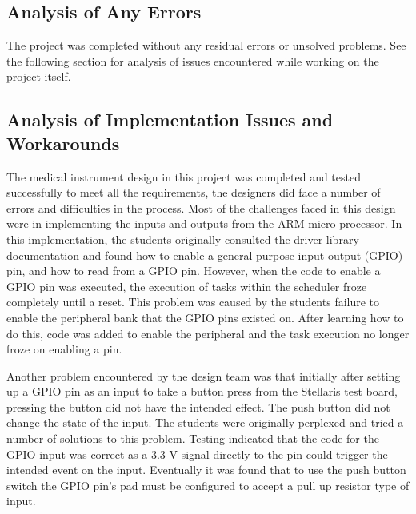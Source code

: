\documentclass[12pt]{article} %
\begin{document}
    \subsection{Analysis of Any Errors}
    The project was completed without any residual errors or unsolved problems.
    See the following section for analysis of issues encountered while working
    on the project itself.

    \subsection{Analysis of Implementation Issues and Workarounds}



    The medical instrument design in this project was completed and tested
    successfully to meet all the requirements, the designers did face a number
    of errors and difficulties in the process. Most of the challenges faced in
    this design were in implementing the inputs and outputs from the ARM micro
    processor. In this implementation, the students originally consulted the
    driver library documentation and found how to enable a general purpose
    input output (GPIO) pin, and how to read from a GPIO pin. However, when the
    code to enable a GPIO pin was executed, the execution of tasks within the
    scheduler froze completely until a reset. This problem was caused by the
    students failure to enable the peripheral bank that the GPIO pins existed
    on. After learning how to do this, code was added to enable the peripheral
    and the task execution no longer froze on enabling a pin.

    Another problem encountered by the design team was that initially after
    setting up a GPIO pin as an input to take a button press from the Stellaris
    test board, pressing the button did not have the intended effect. The push
    button did not change the state of the input. The students were originally
    perplexed and tried a number of solutions to this problem. Testing
    indicated that the code for the GPIO input was correct as a 3.3 V signal
    directly to the pin could trigger the intended event on the input.
    Eventually it was found that to use the push button switch the GPIO pin's
    pad must be configured to accept a pull up resistor type of input.
\end{document}
